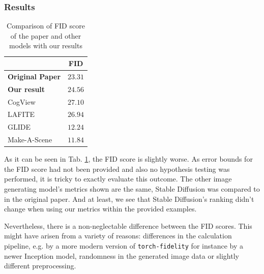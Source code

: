\documentclass[11pt]{article}
\begin{document}
\subsubsection{Results}
\begin{table}[hbp]
    \centering
    \caption{Comparison of FID score of the paper and other models with our results}
    \label{tab:fid_is_comparison}
    \begin{tabular}{lc}
        \toprule
                                                                               & \textbf{FID} \\
        \midrule
        \textbf{Original Paper}                                                & $23.31$      \\
        \textbf{Our result}                                                    & $24.56$      \\\addlinespace
        CogView \cite{ding2021cogviewmasteringtexttoimagegeneration}           & $27.10$      \\
        LAFITE \cite{zhou2022lafitelanguagefreetrainingtexttoimage}            & $26.94$      \\
        GLIDE \cite{rezende2014stochasticbackpropagationapproximateinference}  & $12.24$      \\
        Make-A-Scene \cite{gafni2022makeascenescenebasedtexttoimagegeneration} & $11.84$      \\
        \bottomrule
    \end{tabular}
\end{table}

As it can be seen in Tab. \ref{tab:fid_is_comparison}, the FID score is slightly worse. As error bounds for the FID score had not been provided and also no hypothesis testing was performed, it is tricky to exactly evaluate this outcome. The other image generating model's metrics shown are the same, Stable Diffusion was compared to in the original paper. And at least, we see that Stable Diffusion's ranking didn't change when using our metrics within the provided examples.

Nevertheless, there is a non-neglectable difference between the FID scores. This might have arisen from a variety of reasons: differences in the calculation pipeline, e.g. by a more modern version of \texttt{torch-fidelity} for instance by a newer Inception model, randomness in the generated image data or slightly different preprocessing.
\end{document}
